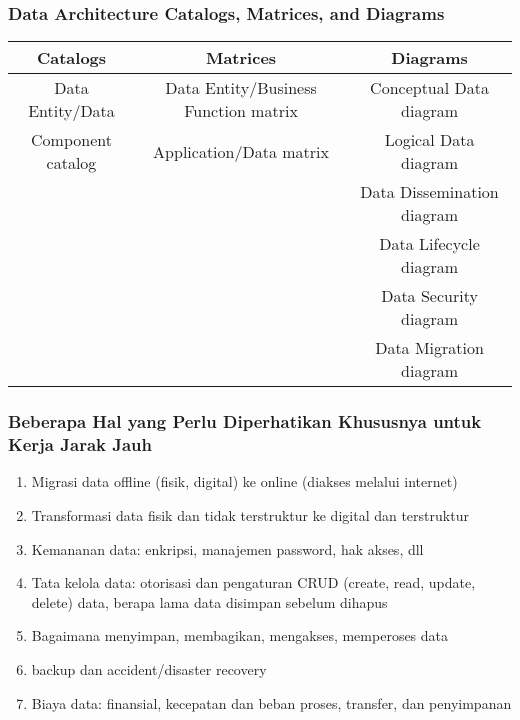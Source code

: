 \documentclass[aspectratio=169, table]{beamer}
\begin{document}
	
	\begin{frame}
		\frametitle{ Data Architecture Catalogs, Matrices, and Diagrams}
		\begin{table}[]
			\begin{tabular}{|c|c|c|}
				\hline
				\textbf{Catalogs} & \textbf{Matrices}   & \textbf{Diagrams} \\ \hline
				Data Entity/Data                   & Data Entity/Business Function matrix & Conceptual Data diagram            \\ 
				Component catalog                  & Application/Data matrix              & Logical Data diagram               \\
				&                                      & Data Dissemination diagram         \\
				&                                      & Data Lifecycle diagram             \\
				&                                      & Data Security diagram              \\
				&                                      & Data Migration diagram             \\ \hline
			\end{tabular}
		\end{table}
	\end{frame}
	
	
	\begin{frame}
		\frametitle{Beberapa Hal yang Perlu Diperhatikan Khususnya untuk Kerja Jarak Jauh}
		\begin{enumerate}
			\item Migrasi data offline (fisik, digital) ke online (diakses melalui internet)
			\item Transformasi data fisik dan tidak terstruktur ke digital dan terstruktur
			\item Kemananan data: enkripsi, manajemen password, hak akses, dll
			\item Tata kelola data: otorisasi dan pengaturan CRUD (create, read, update, delete) data, berapa lama data disimpan sebelum dihapus
			\item Bagaimana menyimpan, membagikan, mengakses, memperoses data
			\item backup dan accident/disaster recovery
			\item Biaya data: finansial, kecepatan dan beban proses, transfer, dan penyimpanan
		\end{enumerate}
	\end{frame}
	
\end{document}
